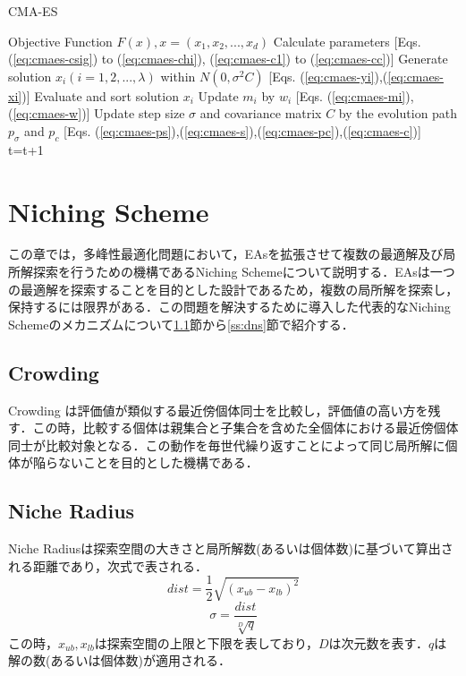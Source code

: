 \documentclass[a4j,11pt]{jarticle}
\begin{document}
\begin{algorithm}[H]
\caption{CMA-ES}
\label{code:cma-es}
\begin{algorithmic}[5]
\REQUIRE Objective Function $F(x), x=(x_1,x_2,...,x_d)$
\STATE Calculate parameters [Eqs. (\ref{eq:cmaes-csig}) to (\ref{eq:cmaes-chi}), (\ref{eq:cmaes-c1}) to (\ref{eq:cmaes-cc})]
\STATE Generate solution $x_i (i=1,2,...,\lambda)$ within $N(0, \sigma^2 C)$ [Eqs. (\ref{eq:cmaes-yi}),(\ref{eq:cmaes-xi})]
\ENDFOR
\STATE Evaluate and sort solution $x_i$
\STATE Update $m_i$ by $w_i$ [Eqs. (\ref{eq:cmaes-mi}),(\ref{eq:cmaes-w})]
\STATE Update step size $\sigma$ and covariance matrix $C$ by the evolution path $p_{\sigma}$ and $p_c$ [Eqs. (\ref{eq:cmaes-ps}),(\ref{eq:cmaes-s}),(\ref{eq:cmaes-pc}),(\ref{eq:cmaes-c})]
\ENDFOR
\STATE t=t+1
\ENDWHILE
\end{algorithmic}
\end{algorithm}

\newpage
\section{Niching Scheme}
\label{sec:ns}
この章では，多峰性最適化問題において，EAsを拡張させて複数の最適解及び局所解探索を行うための機構であるNiching Schemeについて説明する．EAsは一つの最適解を探索することを目的とした設計であるため，複数の局所解を探索し，保持するには限界がある．この問題を解決するために導入した代表的なNiching Schemeのメカニズムについて\ref{ss:Crowding}節から\ref{ss:dns}節で紹介する．

\subsection{Crowding}
\label{ss:Crowding}
Crowding \cite{Crowding} は評価値が類似する最近傍個体同士を比較し，評価値の高い方を残す．この時，比較する個体は親集合と子集合を含めた全個体における最近傍個体同士が比較対象となる．この動作を毎世代繰り返すことによって同じ局所解に個体が陥らないことを目的とした機構である．

\subsection{Niche Radius}
\label{ss:nr}
Niche Radiusは探索空間の大きさと局所解数(あるいは個体数)に基づいて算出される距離であり，次式で表される．
\begin{equation}
\label{eq:nr-d}
dist=\frac{1}{2}\sqrt{(x_{ub}-x_{lb})^2}
\end{equation}
\begin{equation}
\label{eq:nr-s}
\sigma=\frac{dist}{\sqrt[D]{q}}
\end{equation}
この時，$x_{ub},x_{lb}$は探索空間の上限と下限を表しており，$D$は次元数を表す．$q$は解の数(あるいは個体数)が適用される．
\end{document}
